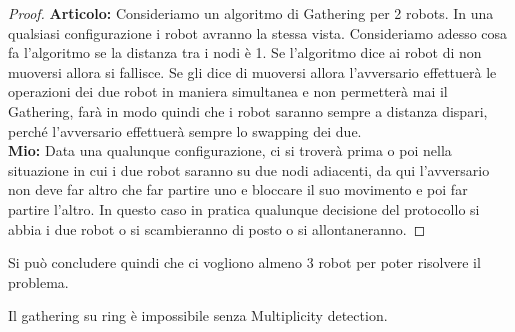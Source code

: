 \begin{proof}
    \textbf{Articolo:} Consideriamo un algoritmo di Gathering per 2 robots. In una
    qualsiasi configurazione i robot avranno la stessa vista. Consideriamo adesso
    cosa fa l'algoritmo se la distanza tra i nodi è 1. Se l'algoritmo dice ai
    robot di non muoversi allora si fallisce. Se gli dice di muoversi allora
    l'avversario effettuerà le operazioni dei due robot in maniera simultanea e
    non permetterà mai il Gathering, farà in modo quindi che i robot saranno
    sempre a distanza dispari, perché l'avversario effettuerà sempre lo swapping
    dei due.\\
    \textbf{Mio:} Data una qualunque configurazione, ci si troverà prima o poi
    nella situazione in cui i due robot saranno su due nodi adiacenti, da qui
    l'avversario non deve far altro che far partire uno e bloccare il suo
    movimento e poi far partire l'altro. In questo caso in pratica qualunque
    decisione del protocollo si abbia i due robot o si scambieranno di posto o si
    allontaneranno.
\end{proof}

Si può concludere quindi che ci vogliono almeno 3 robot per poter risolvere il
problema.

\begin{theorem}
    Il gathering su ring è impossibile senza Multiplicity detection.
\end{theorem}


